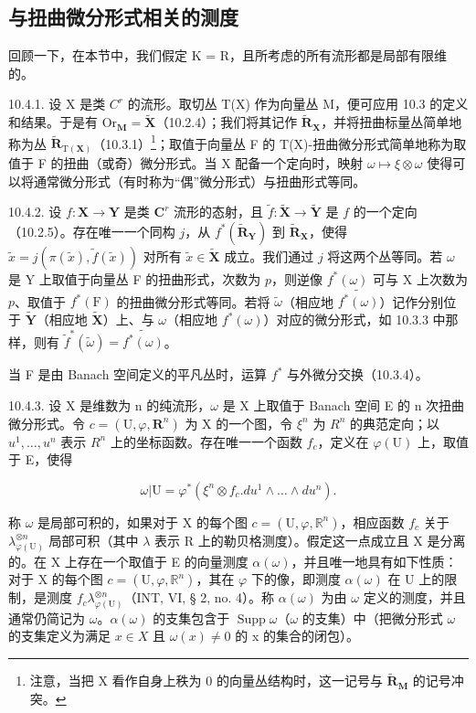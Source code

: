 \subsection{与扭曲微分形式相关的测度}

回顾一下，在本节中，我们假定 K = R，且所考虑的所有流形都是局部有限维的。

10.4.1. 设 X 是类 \(C^{r}\) 的流形。取切丛 T(X) 作为向量丛 M，便可应用 10.3 的定义和结果。于是有 \(\mathrm{Or}_{\mathbf{M}} = \tilde{\mathbf{X}}\)（10.2.4）；我们将其记作 \(\tilde{\mathbf{R}}_{\mathbf{X}}\)，并将扭曲标量丛简单地称为丛 \(\tilde{\mathbf{R}}_{\mathrm{T}(\mathbf{X})}\)（10.3.1）\footnote{注意，当把 X 看作自身上秩为 0 的向量丛结构时，这一记号与 \(\widetilde{\mathbf{R}}_{\mathbf{M}}\) 的记号冲突。}；取值于向量丛 F 的 T(X)-扭曲微分形式简单地称为取值于 F 的扭曲（或奇）微分形式。当 X 配备一个定向时，映射 \(\omega \mapsto \xi \otimes \omega\) 使得可以将通常微分形式（有时称为“偶”微分形式）与扭曲形式等同。

10.4.2. 设 \(f\colon\mathbf{X}\to\mathbf{Y}\) 是类 \(\mathbf{C}^{r}\) 流形的态射，且 \(\tilde{f}\colon\tilde{\mathbf{X}}\to\tilde{\mathbf{Y}}\) 是 \(f\) 的一个定向（10.2.5）。存在唯一一个同构 \(j\)，从 \(f^{*}(\widetilde{\mathbf{R}}_{\mathbf{Y}})\) 到 \(\widetilde{\mathbf{R}}_{\mathbf{X}}\)，使得 \(\tilde{x}=j(\pi(\tilde{x}),\tilde{f}(\tilde{x}))\) 对所有 \(\tilde{x}\in\tilde{\mathbf{X}}\) 成立。我们通过 \(j\) 将这两个丛等同。若 \(\omega\) 是 Y 上取值于向量丛 F 的扭曲形式，次数为 \(p\)，则逆像 \(f^{*}(\omega)\) 可与 X 上次数为 \(p\)、取值于 \(f^{*}(\mathrm{F})\) 的扭曲微分形式等同。若将 \(\tilde{\omega}\)（相应地 \(\widetilde{f^{*}(\omega)}\)）记作分别位于 \(\tilde{\mathbf{Y}}\)（相应地 \(\tilde{\mathbf{X}}\)）上、与 \(\omega\)（相应地 \(f^{*}(\omega)\)）对应的微分形式，如 10.3.3 中那样，则有 \(\tilde{f}^{*}(\tilde{\omega})=\widetilde{f^{*}(\omega)}\)。

当 F 是由 Banach 空间定义的平凡丛时，运算 \(f^*\) 与外微分交换（10.3.4）。

10.4.3. 设 X 是维数为 n 的纯流形，\(\omega\) 是 X 上取值于 Banach 空间 E 的 n 次扭曲微分形式。令 \(c = (\mathrm{U}, \varphi, \mathbf{R}^{n})\) 为 X 的一个图，令 \(\xi^{n}\) 为 \(R^{n}\) 的典范定向；以 \(u^{1}, \ldots, u^{n}\) 表示 \(R^{n}\) 上的坐标函数。存在唯一一个函数 \(f_{c}\)，定义在 \(\varphi(\mathrm{U})\) 上，取值于 E，使得

\[
\omega | \mathrm{U} = \varphi^ {*} (\xi^ {n} \otimes f _ {c}. d u ^ {1} \wedge \dots \wedge d u ^ {n}).
\]

称 \(\omega\) 是局部可积的，如果对于 X 的每个图 \(c = (\mathrm{U},\varphi ,\mathbb{R}^n)\)，相应函数 \(f_{c}\) 关于 \(\lambda_{\varphi (\mathrm{U})}^{\otimes n}\) 局部可积（其中 \(\lambda\) 表示 R 上的勒贝格测度）。假定这一点成立且 X 是分离的。在 X 上存在一个取值于 E 的向量测度 \(\alpha (\omega)\)，并且唯一地具有如下性质：对于 X 的每个图 \(c = (\mathrm{U},\varphi ,\mathbb{R}^n)\)，其在 \(\varphi\) 下的像，即测度 \(\alpha (\omega)\) 在 U 上的限制，是测度 \(f_{c}\lambda_{\varphi(\mathrm{U})}^{\otimes n}\)（INT, VI, § 2, no. 4）。称 \(\alpha (\omega)\) 为由 \(\omega\) 定义的测度，并且通常仍简记为 \(\omega\)。\(\alpha (\omega)\) 的支集包含于 \(\operatorname{Supp}\omega\)（\(\omega\) 的支集）中（把微分形式 \(\omega\) 的支集定义为满足 \(x\in X\) 且 \(\omega (x)\neq 0\) 的 x 的集合的闭包）。

